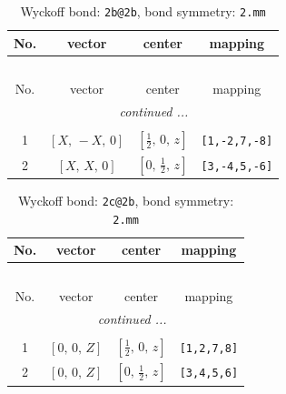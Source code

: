 \documentclass[fleqn,8pt]{jsarticle}
\begin{document}
\renewcommand{\arraystretch}{1.2}
\begin{longtable}{cccc}
\caption{Wyckoff bond: {\tt 2b@2b}, bond symmetry: {\tt 2.mm}}
 \\
 \hline \hline
No. & vector & center & mapping \\ \hline \endfirsthead

\multicolumn{3}{l}{\tablename\ \thetable{}} \\
 \hline \hline
No. & vector & center & mapping \\ \hline \endhead

 \hline \hline
\multicolumn{3}{r}{\footnotesize\it continued ...} \\ \endfoot

 \hline \hline
\multicolumn{3}{r}{} \\ \endlastfoot

1 & $\left[ X,\, - X,\, 0 \right]$ & $\left[ \frac{1}{2},\, 0,\, z \right]$ & {\tt [1,-2,7,-8]} \\ \hline
2 & $\left[ X,\, X,\, 0 \right]$ & $\left[ 0,\, \frac{1}{2},\, z \right]$ & {\tt [3,-4,5,-6]} \\
\end{longtable}
\renewcommand{\arraystretch}{1.2}
\begin{longtable}{cccc}
\caption{Wyckoff bond: {\tt 2c@2b}, bond symmetry: {\tt 2.mm}}
 \\
 \hline \hline
No. & vector & center & mapping \\ \hline \endfirsthead

\multicolumn{3}{l}{\tablename\ \thetable{}} \\
 \hline \hline
No. & vector & center & mapping \\ \hline \endhead

 \hline \hline
\multicolumn{3}{r}{\footnotesize\it continued ...} \\ \endfoot

 \hline \hline
\multicolumn{3}{r}{} \\ \endlastfoot

1 & $\left[ 0,\, 0,\, Z \right]$ & $\left[ \frac{1}{2},\, 0,\, z \right]$ & {\tt [1,2,7,8]} \\ \hline
2 & $\left[ 0,\, 0,\, Z \right]$ & $\left[ 0,\, \frac{1}{2},\, z \right]$ & {\tt [3,4,5,6]} \\
\end{longtable}
\renewcommand{\arraystretch}{1.2}
\end{document}
